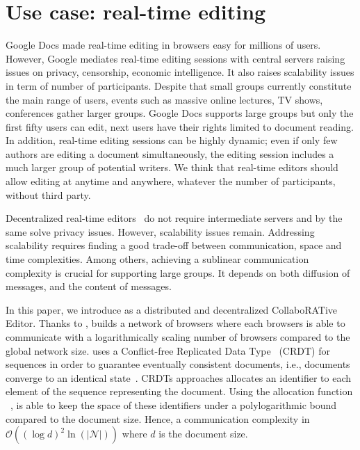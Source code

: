 
\section{Use case: real-time editing}


Google Docs made real-time editing in browsers easy for millions of
users. However, Google mediates real-time editing sessions with central servers
raising issues on privacy, censorship, economic intelligence. It also raises
scalability issues in term of number of participants.  Despite that small groups
currently constitute the main range of users, events such as massive online
lectures, TV shows, conferences gather larger groups.  Google Docs supports
large groups but only the first fifty users can edit, next users have their
rights limited to document reading. In addition, real-time editing sessions can
be highly dynamic; even if only few authors are editing a document
simultaneously, the editing session includes a much larger group of potential
writers. We think that real-time editors should allow editing at anytime and
anywhere, whatever the number of participants, without third party.

Decentralized real-time editors~\cite{oster2006data, sun1998operational,
  sun2009contextbased} do not require intermediate servers and by the same solve
privacy issues. However, scalability issues remain.  Addressing scalability
requires finding a good trade-off between communication, space and time
complexities. Among others, achieving a sublinear communication complexity is
crucial for supporting large groups.  It depends on both diffusion of messages,
and the content of messages.

In this paper, we introduce \CRATE as a distributed and decentralized
CollaboRATive Editor. Thanks to \SPRAY, \CRATE builds a network of browsers
where each browsers is able to communicate with a logarithmically scaling number
of browsers compared to the global network size.  \CRATE uses a Conflict-free
Replicated Data Type~\cite{shapiro2011conflict, shapiro2011comprehensive} (CRDT)
for sequences in order to guarantee eventually consistent documents, i.e.,
documents converge to an identical state~\cite{bailis2013eventual}. CRDTs
approaches allocates an identifier to each element of the sequence representing
the document. Using the allocation function \LSEQ~\cite{nedelec2013lseq}, \CRATE
is able to keep the space of these identifiers under a polylogarithmic bound
compared to the document size. Hence, a communication complexity in
$\mathcal{O}((\log d)^2\ln(|\mathcal{N}|))$ where $d$ is the document size.

